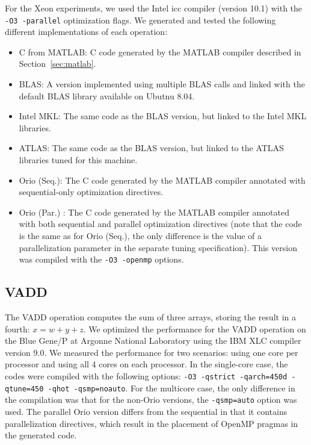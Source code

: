 \documentclass[11pt]{article}
\newenvironment{itemizer}{\begin{itemize}\setlength{\parsep}{0cm}\setlength{\itemsep}{-.3em}}{\end{itemize}}
\begin{document}
For the Xeon experiments, we used the Intel icc compiler (version 10.1) with the \texttt{-O3 -parallel} optimization flags. We generated and tested the following different implementations of each operation:
\begin{itemizer}
\item C from MATLAB: C code generated by the MATLAB compiler described in Section~\ref{sec:matlab}.
\item BLAS: A version implemented using multiple BLAS calls and linked with the default BLAS library available on Ubutnu 8.04.
\item Intel MKL: The same code as the BLAS version, but linked to the Intel MKL libraries.
\item ATLAS: The same code as the BLAS version, but linked to the ATLAS libraries tuned for this machine.
\item Orio (Seq.): The C code generated by the MATLAB compiler annotated with sequential-only optimization directives.
\item Orio (Par.) : The C code generated by the MATLAB compiler annotated with both sequential and parallel optimization directives (note that the code is the same as for Orio (Seq.), the only difference is the value of a parallelization parameter in the separate tuning specification). This version was compiled with the \texttt{-O3 -openmp} options.
\end{itemizer}

\subsection{VADD}
\label{sec:vadd}

The VADD operation computes the sum of three arrays, storing the result in a fourth: $x = w + y + z$.
We optimized the performance for the VADD operation on the Blue Gene/P at Argonne National Laboratory using the IBM XLC compiler version 9.0. We measured the performance for two scenarios: using one core per processor and using all 4 cores on each processor. In the single-core case, the codes were compiled with the following options: \texttt{-O3 -qstrict -qarch=450d -qtune=450 -qhot -qsmp=noauto}. For the multicore case, the only difference in the compilation was that for the non-Orio versions, the \texttt{-qsmp=auto} option was used. The parallel Orio version differs from the sequential in that it contains parallelization directives, which result in the placement of OpenMP pragmas in the generated code.
\end{document}
